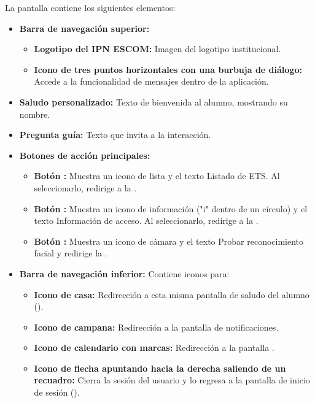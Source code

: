 La pantalla contiene los siguientes elementos:
\begin{itemize}
	\item \textbf{Barra de navegación superior:}
	\begin{itemize}
		\item \textbf{Logotipo del IPN ESCOM:} Imagen del logotipo institucional.
		\item \textbf{Icono de tres puntos horizontales con una burbuja de diálogo:} Accede a la funcionalidad de mensajes dentro de la aplicación.
	\end{itemize}
	\item \textbf{Saludo personalizado:} Texto de bienvenida al alumno, mostrando su nombre.
	\item \textbf{Pregunta guía:} Texto que invita a la interacción.
	\item \textbf{Botones de acción principales:}
	\begin{itemize}
		\item \textbf{Botón :} Muestra un icono de lista y el texto Listado de ETS. Al seleccionarlo, redirige a la .
		\item \textbf{Botón :} Muestra un icono de información ("i" dentro de un círculo) y el texto Información de acceso. Al seleccionarlo, redirige a la .
		\item \textbf{Botón :} Muestra un icono de cámara y el texto Probar reconocimiento facial y redirige la .
	\end{itemize}
	\item \textbf{Barra de navegación inferior:} Contiene iconos para:
	\begin{itemize}
		\item \textbf{Icono de casa:} Redirección a esta misma pantalla de saludo del alumno ().
		\item \textbf{Icono de campana:} Redirección a la pantalla de notificaciones.
		\item \textbf{Icono de calendario con marcas:} Redirección a la pantalla .
		\item \textbf{Icono de flecha apuntando hacia la derecha saliendo de un recuadro:} Cierra la sesión del usuario y lo regresa a la pantalla de inicio de sesión ().
	\end{itemize}
\end{itemize}


